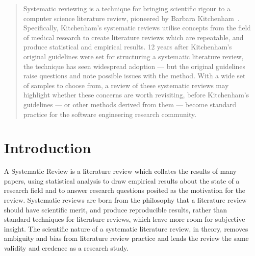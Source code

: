 

\maketitle

\begin{abstract}
Systematic reviewing is a technique for bringing scientific rigour to a computer science literature review, pioneered by Barbara Kitchenham~\citep{Kitchenham2004}. Specifically, Kitchenham's systematic reviews utilise concepts from the field of medical research to create literature reviews which are repeatable, and produce statistical and empirical results. 12 years after Kitchenham's original guidelines were set for structuring a systematic literature review, the technique has seen widespread adoption --- but the original guidelines raise questions and note possible issues with the method. With a wide set of samples to choose from, a review of these systematic reviews may highlight whether these concerns are worth revisiting, before Kitchenham's guidelines --- or other methods derived from them --- become standard practice for the software engineering research community.
\end{abstract}

\section{Introduction}
A Systematic Review is a literature review which collates the results of many papers, using statistical analysis to draw empirical results about the state of a research field and to answer research questions posited as the motivation for the review. Systematic reviews are born from the philosophy that a literature review should have scientific merit, and produce reproducible results, rather than standard techniques for literature reviews, which leave more room for subjective insight. The scientific nature of a systematic literature review, in theory, removes ambiguity and bias from literature review practice and lends the review the same validity and credence as a research study.\par

